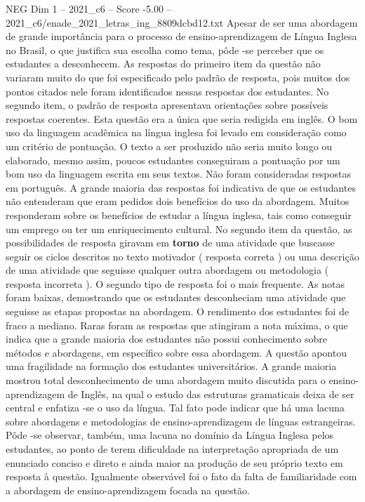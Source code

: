 \begin{textsample}{NEG Dim 1 – 2021\_c6 – Score -5.00 – 2021\_c6/enade\_2021\_letras\_ing\_8809dcbd12.txt}
Apesar de ser uma abordagem de grande importância para o processo de ensino-aprendizagem de Língua Inglesa no Brasil, o que justifica sua escolha como tema, pôde -se perceber que os estudantes a desconhecem.
As respostas do primeiro item da questão não variaram muito do que foi especificado pelo padrão de resposta, pois muitos dos pontos citados nele foram identificados nessas respostas dos estudantes.
No segundo item, o padrão de resposta apresentava orientações sobre possíveis respostas coerentes.
Esta questão era a única que seria redigida em inglês.
O bom uso da linguagem acadêmica na língua inglesa foi levado em consideração como um critério de pontuação.
O texto a ser produzido não seria muito longo ou elaborado, mesmo assim, poucos estudantes conseguiram a pontuação por um bom uso da linguagem escrita em seus textos.
Não foram consideradas respostas em português.
A grande maioria das respostas foi indicativa de que os estudantes não entenderam que eram pedidos dois benefícios do uso da abordagem.
Muitos responderam sobre os benefícios de estudar a língua inglesa, tais como conseguir um emprego ou ter um enriquecimento cultural.
No segundo item da questão, as possibilidades de resposta giravam em \textbf{torno} de uma atividade que buscasse seguir os ciclos descritos no texto motivador ( resposta correta ) ou uma descrição de uma atividade que seguisse qualquer outra abordagem ou metodologia ( resposta incorreta ).
O segundo tipo de resposta foi o mais frequente.
As notas foram baixas, demostrando que os estudantes desconheciam uma atividade que seguisse as etapas propostas na abordagem.
O rendimento dos estudantes foi de fraco a mediano.
Raras foram as respostas que atingiram a nota máxima, o que indica que a grande maioria dos estudantes não possui conhecimento sobre métodos e abordagens, em específico sobre essa abordagem.
A questão apontou uma fragilidade na formação dos estudantes universitários.
A grande maioria mostrou total desconhecimento de uma abordagem muito discutida para o ensino-aprendizagem de Inglês, na qual o estudo das estruturas gramaticais deixa de ser central e enfatiza -se o uso da língua.
Tal fato pode indicar que há uma lacuna sobre abordagens e metodologias de ensino-aprendizagem de línguas estrangeiras.
Pôde -se observar, também, uma lacuna no domínio da Língua Inglesa pelos estudantes, ao ponto de terem dificuldade na interpretação apropriada de um enunciado conciso e direto e ainda maior na produção de seu próprio texto em resposta à questão.
Igualmente observável foi o fato da falta de familiaridade com a abordagem de ensino-aprendizagem focada na questão.

\end{textsample}
